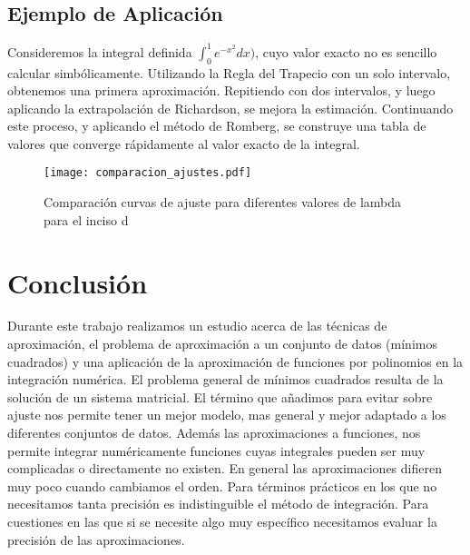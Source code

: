 \documentclass{article}
\begin{document}
\subsection{Ejemplo de Aplicación}

Consideremos la integral definida $\int_{0}^{1} e^{-x^2} dx )$, cuyo valor exacto no es sencillo calcular simbólicamente. Utilizando la Regla del Trapecio con un solo intervalo, obtenemos una primera aproximación. Repitiendo con dos intervalos, y luego aplicando la extrapolación de Richardson, se mejora la estimación. Continuando este proceso, y aplicando el método de Romberg, se construye una tabla de valores que converge rápidamente al valor exacto de la integral.

\begin{figure}
    \centering
    \texttt{[image: comparacion\_ajustes.pdf]}
    \caption{Comparación curvas de ajuste para diferentes valores de lambda para el inciso d}
    \label{lambdad}
\end{figure}


\section{Conclusión}
Durante este trabajo realizamos un estudio acerca de las técnicas de aproximación, el problema de aproximación a un conjunto de datos (mínimos cuadrados) y una aplicación de la aproximación de funciones por polinomios en la integración numérica. El problema general de mínimos cuadrados resulta de la solución de un sistema matricial. El término que añadimos para evitar sobre ajuste nos permite tener un mejor modelo, mas general y mejor adaptado a los diferentes conjuntos de datos. Además las aproximaciones a funciones, nos permite integrar numéricamente funciones cuyas integrales pueden ser muy complicadas o directamente no existen. En general las aproximaciones difieren muy poco cuando cambiamos el orden. Para términos prácticos en los que no necesitamos tanta precisión es indistinguible el método de integración. Para cuestiones en las que si se necesite algo muy específico necesitamos evaluar la precisión de las aproximaciones. 



\end{document}
